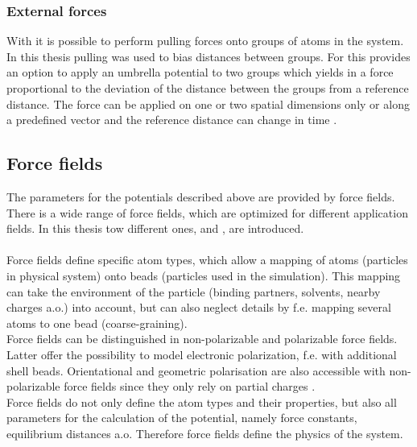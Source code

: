 \subsubsection{External forces}
With \gromacs{} it is possible to perform pulling forces onto groups of atoms in the system. In this thesis pulling was used to bias distances between groups. For this \gromacs{} provides an option to apply an umbrella potential to two groups which yields in a force proportional to the deviation of the distance between the groups from a reference distance. The force can be applied on one or two spatial dimensions only or along a predefined vector and the reference distance can change in time  \autocite[p. 154-159]{gromacsManual}.
\subsection{Force fields}
The parameters for the potentials described above are provided by force fields. There is a wide range of force fields, which are optimized for different application fields. In this thesis tow different ones, \charmm{} and \martini{}, are introduced.\\
\\
Force fields define specific atom types, which allow a mapping of atoms (particles in physical system) onto beads (particles used in the simulation). This mapping can take the environment of the particle (binding partners, solvents, nearby charges a.o.) into account, but can also neglect details by f.e. mapping several atoms to one bead (coarse-graining).\\
Force fields can be distinguished in non-polarizable and polarizable force fields. Latter offer the possibility to model electronic polarization, f.e. with additional shell beads. Orientational and geometric polarisation are also accessible with non-polarizable force fields since they only rely on partial charges \autocite[p. 215ff]{greenBook}.\\  
Force fields do not only define the atom types and their properties, but also all parameters for the calculation of the potential, namely force constants, equilibrium distances a.o. Therefore force fields define the physics of the system.
